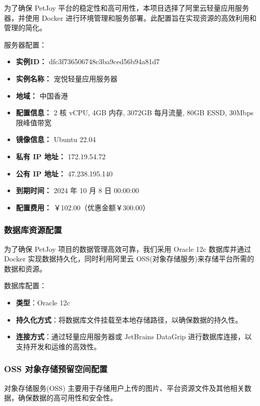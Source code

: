为了确保 PetJoy 平台的稳定性和高可用性，本项目选择了阿里云轻量应用服务器，并使用 Docker 进行环境管理和服务部署。此配置旨在实现资源的高效利用和管理的简化。

服务器配置：
\begin{itemize}
    \item \textbf{实例ID：} dfc3f736506748c3ba9ced56b94a81d7
    \item \textbf{实例名称：} 宠悦轻量应用服务器
    \item \textbf{地域：} 中国香港
    \item \textbf{配置信息：} 2 核 vCPU, 4GB 内存, 3072GB 每月流量, 80GB ESSD, 30Mbps 限峰值带宽
    \item \textbf{镜像信息：} Ubuntu 22.04
    \item \textbf{私有 IP 地址：} 172.19.54.72
    \item \textbf{公有 IP 地址：} 47.238.195.140
    \item \textbf{到期时间：} 2024 年 10 月 8 日 00:00:00
    \item \textbf{配置费用：} ￥102.00（优惠金额￥300.00）
\end{itemize}

\subsubsection{数据库资源配置}

为了确保 PetJoy 项目的数据管理高效可靠，我们采用 Oracle 12c 数据库并通过 Docker 实现数据持久化，同时利用阿里云 OSS(对象存储服务)来存储平台所需的数据和资源。

数据库配置：
\begin{itemize}
  \item \textbf{类型}：Oracle 12c
  \item \textbf{持久化方式}：将数据库文件挂载至本地存储路径，以确保数据的持久性。
  \item \textbf{连接方式}：通过轻量应用服务器或 JetBrains DataGrip 进行数据库连接，以支持开发和运维的高效性。
\end{itemize}

\subsubsection{OSS 对象存储预留空间配置}

对象存储服务(OSS) 主要用于存储用户上传的图片、平台资源文件及其他相关数据，确保数据的高可用性和安全性。

